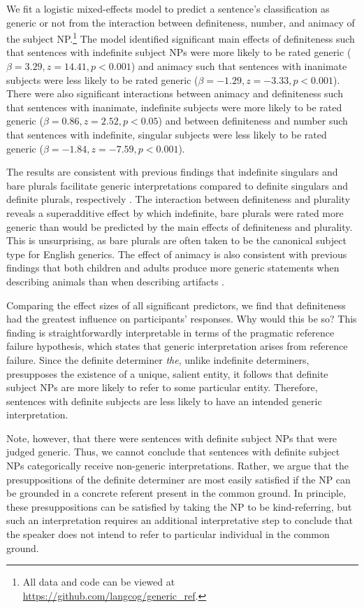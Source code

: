 \documentclass[10pt,letterpaper]{article}
\begin{document}
We fit a logistic mixed-effects model to predict a sentence's classification as generic or not from the interaction between definiteness, number, and animacy of the subject NP.\footnote{All data and code can be viewed at \url{https://github.com/langcog/generic_ref}.} The model identified significant main effects of definiteness such that sentences with indefinite subject NPs were more likely to be rated generic (\(\beta = 3.29, z = 14.41, p < 0.001\)) and animacy such that sentences with inanimate subjects were less likely to be rated generic (\(\beta = -1.29, z = -3.33, p < 0.001\)). There were also significant interactions between animacy and definiteness such that sentences with inanimate, indefinite subjects were more likely to be rated generic (\(\beta = 0.86, z = 2.52, p < 0.05\)) and between definiteness and number such that sentences with indefinite, singular subjects were less likely to be rated generic (\(\beta = -1.84, z = -7.59, p < 0.001\)).

The results are consistent with previous findings that indefinite singulars and bare plurals facilitate generic interpretations compared to definite singulars and definite plurals, respectively \cite{Cimpian:2011, Gelman:2003}. The interaction between definiteness and plurality reveals a superadditive effect by which indefinite, bare plurals were rated more generic than would be predicted by the main effects of definiteness and plurality. This is unsurprising, as bare plurals are often taken to be the canonical subject type for English generics. The effect of animacy is also consistent with previous findings that both children and adults produce more generic statements when describing animals than when describing artifacts \cite{Brandone:2009}.

Comparing the effect sizes of all significant predictors, we find that definiteness had the greatest influence on participants' responses. Why would this be so? This finding is straightforwardly interpretable in terms of the pragmatic reference failure hypothesis, which states that generic interpretation arises from reference failure. Since the definite determiner \textit{the}, unlike indefinite determiners, presupposes the existence of a unique, salient entity, it follows that definite subject NPs are more likely to refer to some particular entity. Therefore, sentences with definite subjects are less likely to have an intended generic interpretation.

Note, however, that there were sentences with definite subject NPs that were judged generic. Thus, we cannot conclude that sentences with definite subject NPs categorically receive non-generic interpretations. Rather, we argue that the presuppositions of the definite determiner are most easily satisfied if the NP can be grounded in a concrete referent present in the common ground. In principle, these presuppositions can be satisfied by taking the NP to be kind-referring, but such an interpretation requires an additional interpretative step to conclude that the speaker does not intend to refer to particular individual in the common ground.
\end{document}
